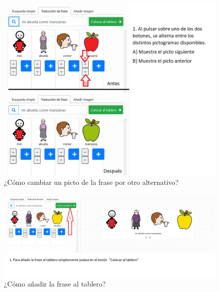 \begin{figure}[h!]
	\centering
	\includegraphics[width=\linewidth]{Imagenes/Bitmap/Tarea3-Pista2}
	\caption{¿Cómo cambiar un picto de la frase por otro alternativo?}
	\label{fig:tarea3-pista2}
\end{figure}



\begin{figure}[h!]
	\centering
	\includegraphics[width=\linewidth]{Imagenes/Bitmap/Tarea3-Pista3}
	\caption{¿Cómo añadir la frase al tablero?}
	\label{fig:tarea3-pista3}
\end{figure}

